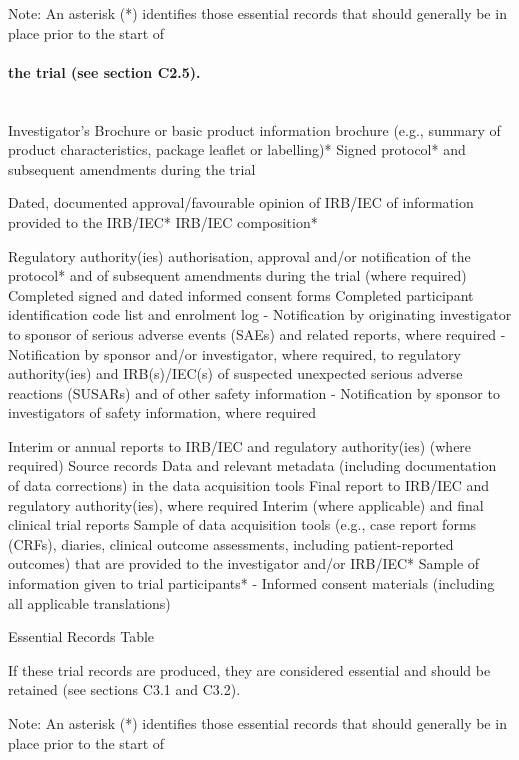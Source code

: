 \documentclass[11pt]{article}
\begin{document}
Note: An asterisk (*) identifies those essential records that should generally be in place prior to the start of


\paragraph{the trial (see section C2.5).}\mbox{}\\

Investigator's Brochure or basic product information brochure (e.g., summary of product characteristics, package leaflet or labelling)* Signed protocol* and subsequent amendments during the trial


Dated, documented approval/favourable opinion of IRB/IEC of information provided to the IRB/IEC* IRB/IEC composition*


Regulatory authority(ies) authorisation, approval and/or notification of the protocol* and of subsequent amendments during the trial (where required) Completed signed and dated informed consent forms Completed participant identification code list and enrolment log - Notification by originating investigator to sponsor of serious adverse events (SAEs) and related reports, where required - Notification by sponsor and/or investigator, where required, to regulatory authority(ies) and IRB(s)/IEC(s) of suspected unexpected serious adverse reactions (SUSARs) and of other safety information - Notification by sponsor to investigators of safety information, where required


Interim or annual reports to IRB/IEC and regulatory authority(ies) (where required) Source records Data and relevant metadata (including documentation of data corrections) in the data acquisition tools Final report to IRB/IEC and regulatory authority(ies), where required Interim (where applicable) and final clinical trial reports Sample of data acquisition tools (e.g., case report forms (CRFs), diaries, clinical outcome assessments, including patient-reported outcomes) that are provided to the investigator and/or IRB/IEC* Sample of information given to trial participants* - Informed consent materials (including all applicable translations)


Essential Records Table


If these trial records are produced, they are considered essential and should be retained (see sections C3.1 and C3.2).


Note: An asterisk (*) identifies those essential records that should generally be in place prior to the start of
\end{document}
